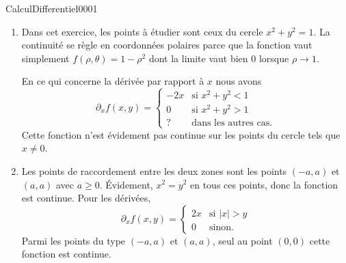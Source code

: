 \begin{corrige}{CalculDifferentiel0001}
\begin{enumerate}
		\item
			Dans cet exercice, les points à étudier sont ceux du cercle $x^2+y^2=1$. La continuité se règle en coordonnées polaires parce que la fonction vaut simplement $f(\rho,\theta)=1-\rho^2$ dont la limite vaut bien $0$ lorsque $\rho\to 1$.

			En ce qui concerne la dérivée par rapport à $x$ nous avons
			\begin{equation}
				\partial_xf(x,y)=\begin{cases}
					-2x	&	\text{si }x^2+y^2<1\\
					0	&	 \text{si }x^2+y^2>1\\
					?	&	\text{dans les autres cas}.
				\end{cases}
			\end{equation}
			Cette fonction n'est évidement pas continue sur les points du cercle tels que $x\neq 0$.

		\item
			Les points de raccordement entre les deux zones sont les points $(-a,a)$ et $(a,a)$ avec $a\geq 0$. Évidement, $x^2=y^2$ en tous ces points, donc la fonction est continue. Pour les dérivées,
			\begin{equation}
				\partial_xf(x,y)=\begin{cases}
					2x	&	\text{si }| x |>y\\
					0	&	 \text{sinon.}
				\end{cases}
			\end{equation}
			Parmi les points du type $(-a,a)$ et $(a,a)$, seul au point $(0,0)$ cette fonction est continue.
			
	\end{enumerate}

\end{corrige}
